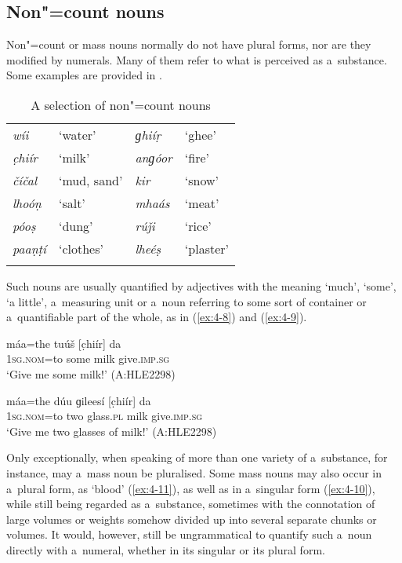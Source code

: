 \subsection{Non"=count nouns}
\label{subsec:4-4-1}


Non"=count or mass nouns normally do not have plural forms, nor are they modified by numerals. Many of them refer to what is perceived as a~substance. Some examples are provided in .



\begin{table}[H]
\caption{A selection of non"=count nouns}
\begin{tabularx}{\textwidth}{ Q Q Q Q }
\lsptoprule
\textit{wíi} &
`water' &
\textit{ɡhiíṛ} &
`ghee'\\
\textit{c̣hiír} &
`milk' &
\textit{anɡóor} &
`fire'\\
\textit{číčal} &
`mud, sand' &
\textit{kir} &
`snow'\\
\textit{lhoóṇ} &
`salt' &
\textit{mhaás} &
`meat'\\
\textit{póoṣ} &
`dung' &
\textit{rúǰi} &
`rice'\\
\textit{paaṇṭí} &
`clothes' &
\textit{lheéṣ} &
`plaster'\\\lspbottomrule
\end{tabularx}
\label{tab:4-ncount}
\end{table}

Such nouns are usually quantified by adjectives with the meaning `much', `some', `a little', a~measuring unit or a~noun referring to some sort of container or a~quantifiable part of the whole, as in (\ref{ex:4-8}) and (\ref{ex:4-9}). 

\begin{exe}
\ex
\label{ex:4-8}
\gll máa=the tuúš [c̣hiír] da \\
	\textsc{1sg.nom}=to some milk give.\textsc{imp.sg} \\
\glt `Give me some milk!' (A:HLE2298)
\end{exe}

\begin{exe}
\ex
\label{ex:4-9}
\gll máa=the dúu ɡileesí [c̣hiír] da \\
	\textsc{1sg.nom}=to two glass.\textsc{pl} milk give.\textsc{imp.sg} \\
\glt `Give me two glasses of milk!' (A:HLE2298)
\end{exe}

Only exceptionally, when speaking of more than one variety of a~substance, for instance, may a~mass noun be pluralised. Some mass nouns may also occur in a~plural form, as `blood' (\ref{ex:4-11}), as well as in a~singular form (\ref{ex:4-10}), while still being regarded as a~substance, sometimes with the connotation of large volumes or weights somehow divided up into several separate chunks or volumes. It would, however, still be ungrammatical to quantify such a~noun directly with a~numeral, whether in its singular or its plural form.

